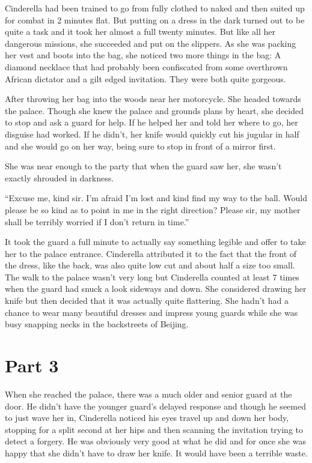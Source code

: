 \documentclass[11pt,letterpaper]{article}
\begin{document}
Cinderella had been trained to go from fully clothed to naked and then suited up for combat in 2 minutes flat. But putting on a dress in the dark turned out to be quite a task and it took her almost a full twenty minutes. But like all her dangerous missions, she succeeded and put on the slippers. As she was packing her vest and boots into the bag, she noticed two more things in the bag: A diamond necklace that had probably been confiscated from some overthrown African dictator and a gilt edged invitation. They were both quite gorgeous.

After throwing her bag into the woods near her motorcycle. She headed towards the palace. Though she knew the palace and grounds plans by heart, she decided to stop and ask a guard for help. If he helped her and told her where to go, her disguise had worked. If he didn't, her knife would quickly cut his jugular in half and she would go on her way, being sure to stop in front of a mirror first.

She was near enough to the party that when the guard saw her, she wasn't exactly shrouded in darkness.

``Excuse me, kind sir. I'm afraid I'm lost and kind find my way to the ball. Would please be so kind as to point in me in the right direction? Please sir, my mother shall be terribly worried if I don't return in time.''

It took the guard a full minute to actually say something legible and offer to take her to the palace entrance. Cinderella attributed it to the fact that the front of the dress, like the back, was also quite low cut and about half a size too small. The walk to the palace wasn't very long but Cinderella counted at least 7 times when the guard had snuck a look sideways and down. She considered drawing her knife but then decided that it was actually quite flattering. She hadn't had a chance to wear many beautiful dresses and impress young guards while she was busy snapping necks in the backstreets of Beijing.

\section*{Part 3}

When she reached the palace, there was a much older and senior guard at the door. He didn't have the younger guard's delayed response and though he seemed to just wave her in, Cinderella noticed his eyes travel up and down her body, stopping for a split second at her hips and then scanning the invitation trying to detect a forgery. He was obviously very good at what he did and for once she was happy that she didn't have to draw her knife. It would have been a terrible waste.
\end{document}

